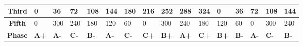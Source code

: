 \documentclass{reportClass}
\begin{document}
\begin{table}[h!]
\begin{tabular}{|clllllllllllllll|}
\multicolumn{1}{|c|}{\textbf{Third}}   & \multicolumn{1}{l|}{0}                                   & \multicolumn{1}{l|}{36}                                  & \multicolumn{1}{l|}{72}                                  & \multicolumn{1}{l|}{108}                                 & \multicolumn{1}{l|}{144}                                 & \multicolumn{1}{l|}{180}                                 & \multicolumn{1}{l|}{216}                                 & \multicolumn{1}{l|}{252}                                 & \multicolumn{1}{l|}{288}                                 & \multicolumn{1}{l|}{324}                                 & \multicolumn{1}{l|}{0}                                   & \multicolumn{1}{l|}{36}                                  & \multicolumn{1}{l|}{72}                                  & \multicolumn{1}{l|}{108}                                 & 144                                 \\ \hline
\multicolumn{1}{|c|}{\textbf{Fifth}}   & \multicolumn{1}{l|}{0}                                   & \multicolumn{1}{l|}{300}                                 & \multicolumn{1}{l|}{240}                                 & \multicolumn{1}{l|}{180}                                 & \multicolumn{1}{l|}{120}                                 & \multicolumn{1}{l|}{60}                                  & \multicolumn{1}{l|}{0}                                   & \multicolumn{1}{l|}{300}                                 & \multicolumn{1}{l|}{240}                                 & \multicolumn{1}{l|}{180}                                 & \multicolumn{1}{l|}{120}                                 & \multicolumn{1}{l|}{60}                                  & \multicolumn{1}{l|}{0}                                   & \multicolumn{1}{l|}{300}                                 & 240                                 \\ \hline
\multicolumn{1}{|c|}{\textbf{Phase}}   & \multicolumn{1}{l|}{\cellcolor[HTML]{FCFF2F}\textbf{A+}} & \multicolumn{1}{l|}{\cellcolor[HTML]{FCFF2F}\textbf{A-}} & \multicolumn{1}{l|}{\cellcolor[HTML]{CBCEFB}\textbf{C-}} & \multicolumn{1}{l|}{\cellcolor[HTML]{90E3FB}\textbf{B-}} & \multicolumn{1}{l|}{\cellcolor[HTML]{FCFF2F}\textbf{A-}} & \multicolumn{1}{l|}{\cellcolor[HTML]{CBCEFB}\textbf{C-}} & \multicolumn{1}{l|}{\cellcolor[HTML]{CBCEFB}\textbf{C+}} & \multicolumn{1}{l|}{\cellcolor[HTML]{90E3FB}\textbf{B+}} & \multicolumn{1}{l|}{\cellcolor[HTML]{FCFF2F}\textbf{A+}} & \multicolumn{1}{l|}{\cellcolor[HTML]{CBCEFB}\textbf{C+}} & \multicolumn{1}{l|}{\cellcolor[HTML]{90E3FB}\textbf{B+}} & \multicolumn{1}{l|}{\cellcolor[HTML]{90E3FB}\textbf{B-}} & \multicolumn{1}{l|}{\cellcolor[HTML]{FCFF2F}\textbf{A-}} & \multicolumn{1}{l|}{\cellcolor[HTML]{CBCEFB}\textbf{C-}} & \cellcolor[HTML]{90E3FB}\textbf{B-} \\ \hline

\end{tabular}
\end{table}
\end{document}
